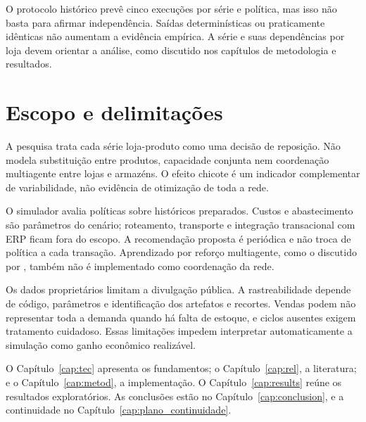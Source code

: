 O protocolo histórico prevê cinco execuções por série e política, mas isso não basta para afirmar independência. Saídas determinísticas ou praticamente idênticas não aumentam a evidência empírica. A série e suas dependências por loja devem orientar a análise, como discutido nos capítulos de metodologia e resultados.

\section{Escopo e delimitações}
\label{sec:delimitacoes}

A pesquisa trata cada série loja-produto como uma decisão de reposição. Não modela substituição entre produtos, capacidade conjunta nem coordenação multiagente entre lojas e armazéns. O efeito chicote é um indicador complementar de variabilidade, não evidência de otimização de toda a rede.

O simulador avalia políticas sobre históricos preparados. Custos e abastecimento são parâmetros do cenário; roteamento, transporte e integração transacional com ERP ficam fora do escopo. A recomendação proposta é periódica e não troca de política a cada transação. Aprendizado por reforço multiagente, como o discutido por \citet{Liu2024HAPPO}, também não é implementado como coordenação da rede.

Os dados proprietários limitam a divulgação pública. A rastreabilidade depende de código, parâmetros e identificação dos artefatos e recortes. Vendas podem não representar toda a demanda quando há falta de estoque, e ciclos ausentes exigem tratamento cuidadoso. Essas limitações impedem interpretar automaticamente a simulação como ganho econômico realizável.

O Capítulo~\ref{cap:tec} apresenta os fundamentos; o Capítulo~\ref{cap:rel}, a literatura; e o Capítulo~\ref{cap:metod}, a implementação. O Capítulo~\ref{cap:results} reúne os resultados exploratórios. As conclusões estão no Capítulo~\ref{cap:conclusion}, e a continuidade no Capítulo~\ref{cap:plano_continuidade}.

\newpage\lhead{\rightmark}
